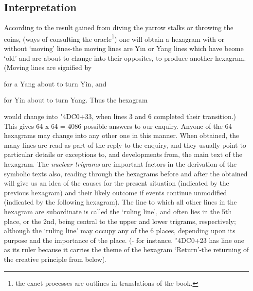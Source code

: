 \documentclass[11pt]{book}
\newcommand{\iching}[1]{{\dejavusanszh\char\numexpr"4DC0+#1}}
\begin{document}
\subsection{Interpretation}

According to the result gained from diving the yarrow stalks or throwing the coins, (ways of consulting the oracle\footnote{the exact processes are outlines in translations of the book.}) one will obtain a hexagram with or without `moving' lines-the moving lines are Yin or Yang lines which have beome `old' and are about to change into their opposites, to produce another hexagram. (Moving lines are signified by  for a Yang about to turn Yin, and  for Yin about to turn Yang. Thus the hexagram  would change into \iching{33}, when lines 3 and 6 completed their transition.) This gives 64 x 64 = 4086 possible answers to our enquiry. Anyone of the 64 hexagrams may change into any other one in this manner. When obtained, the many lines are read as part of the reply to the enquiry, and they usually point to particular details or exceptions to, and developments from, the main text of the hexagram. The \emph{nuclear trigrams} are important factors in the derivation of the symbolic texts also, reading through the hexagrams before and after the obtained will give us an idea of the causes for the present situation (indicated by the previous hexagram) and their likely outcome if events continue unmodified (indicated by the following hexagram). The line to which all other lines in the hexagram are subordinate is called the `ruling line', and often lies in the 5th place, or the 2nd, being central to the upper and lower trigrams, respectively; although the `ruling line' may occupy any of the 6 places, depending upon its purpose and the importance of the place. (- for instance, \iching{23} has line one as its ruler because it carries the theme of the hexagram `Return'-the returning of the creative principle from below).
\end{document}
